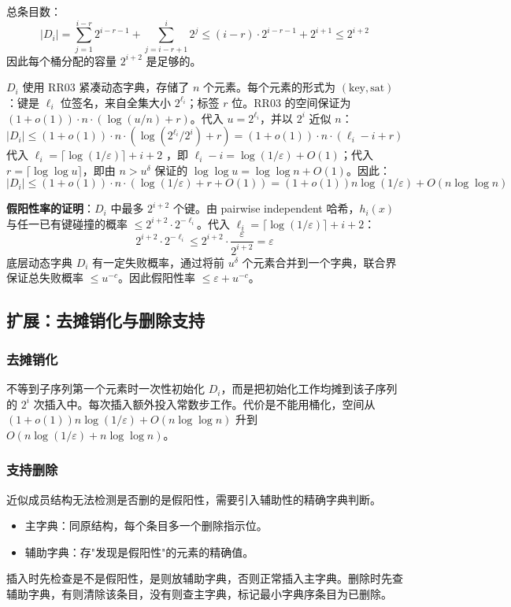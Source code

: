 \documentclass[UTF8,11pt,a4paper]{ctexart}
\begin{document}
总条目数：
\[
|D_i| = \sum_{j=1}^{i-r} 2^{i-r-1} + \sum_{j=i-r+1}^{i} 2^j \le (i-r) \cdot 2^{i-r-1} + 2^{i+1} \le 2^{i+2}
\]
因此每个桶分配的容量 $2^{i+2}$ 是足够的。

$D_i$ 使用 RR03 紧凑动态字典，存储了 $n$ 个元素。每个元素的形式为 $(\text{key}, \text{sat})$：键是 $\ell_i$ 位签名，来自全集大小 $2^{\ell_i}$；标签 $r$ 位。RR03 的空间保证为 $(1+o(1)) \cdot n \cdot (\log(u/n) + r)$。代入 $u = 2^{\ell_i}$，并以 $2^i$ 近似 $n$：
\[
|D_i| \le (1+o(1)) \cdot n \cdot (\log(2^{\ell_i}/2^i) + r) = (1+o(1)) \cdot n \cdot (\ell_i - i + r)
\]
代入 $\ell_i = \lceil\log(1/\varepsilon)\rceil + i + 2$ ，即 $\ell_i - i = \log(1/\varepsilon) + O(1)$；代入 $r = \lceil\log\log u\rceil$，即由 $n > u^\delta$ 保证的 $\log\log u = \log\log n + O(1)$。因此：
\[
|D_i| \le (1+o(1)) \cdot n \cdot (\log(1/\varepsilon) + r + O(1))
      = (1+o(1))n\log(1/\varepsilon) + O(n\log\log n)
\]

\textbf{假阳性率的证明}：$D_i$ 中最多 $2^{i+2}$ 个键。由 pairwise independent 哈希，$h_i(x)$ 与任一已有键碰撞的概率 $\le 2^{i+2} \cdot 2^{-\ell_i}$。代入 $\ell_i = \lceil\log(1/\varepsilon)\rceil + i + 2$：
\[
2^{i+2} \cdot 2^{-\ell_i} \le 2^{i+2} \cdot \frac{\varepsilon}{2^{i+2}} = \varepsilon
\]
底层动态字典 $D_i$ 有一定失败概率，通过将前 $u^\delta$ 个元素合并到一个字典，联合界保证总失败概率 $\le u^{-c}$。因此假阳性率 $\le \varepsilon + u^{-c}$。

\subsection{扩展：去摊销化与删除支持}

\subsubsection{去摊销化}

不等到子序列第一个元素时一次性初始化 $D_i$，而是把初始化工作均摊到该子序列的 $2^i$ 次插入中。每次插入额外投入常数步工作。代价是不能用桶化，空间从 $(1+o(1))n\log(1/\varepsilon) + O(n\log\log n)$ 升到 $O(n\log(1/\varepsilon) + n\log\log n)$。

\subsubsection{支持删除}

近似成员结构无法检测是否删的是假阳性，需要引入辅助性的精确字典判断。
\begin{itemize}
    \item 主字典：同原结构，每个条目多一个删除指示位。
    \item 辅助字典：存"发现是假阳性"的元素的精确值。
\end{itemize}
插入时先检查是不是假阳性，是则放辅助字典，否则正常插入主字典。删除时先查辅助字典，有则清除该条目，没有则查主字典，标记最小字典序条目为已删除。
\end{document}

